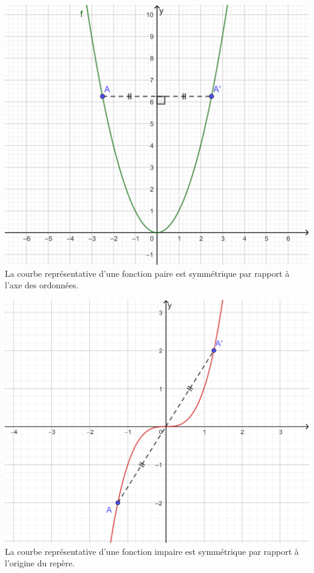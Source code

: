\documentclass[poly]{mesCours}
\begin{document}
\begin{center}
\begin{minipage}{0.45\textwidth}
\includegraphics[width=\textwidth]{Carre.png}
La courbe représentative d'une fonction paire est symmétrique par rapport à l'axe des ordonnées.
\end{minipage} \hfill
\begin{minipage}{0.45\textwidth}
\includegraphics[width=\textwidth]{Cube.png}
La courbe représentative d'une fonction impaire est symmétrique par rapport à l'origine du repère.
\end{minipage}
\end{center}
\newpage
\end{document}
